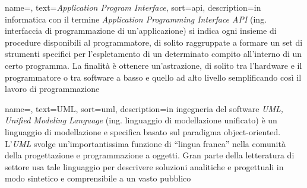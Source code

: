 
\renewcommand{\acronymname}{Acronimi e abbreviazioni}










\renewcommand{\glossaryname}{Glossario}

{
    name=,
    text=\emph{Application Program Interface},
    sort=api,
    description={in informatica con il termine \emph{Application Programming Interface API} (ing. interfaccia di programmazione di un'applicazione) si indica ogni insieme di procedure disponibili al programmatore, di solito raggruppate a formare un set di strumenti specifici per l'espletamento di un determinato compito all'interno di un certo programma. La finalità è ottenere un'astrazione, di solito tra l'hardware e il programmatore o tra software a basso e quello ad alto livello semplificando così il lavoro di programmazione}
}

{
    name=,
    text=UML,
    sort=uml,
    description={in ingegneria del software \emph{UML, Unified Modeling Language} (ing. linguaggio di modellazione unificato) è un linguaggio di modellazione e specifica basato sul paradigma object-oriented. L'\emph{UML} svolge un'importantissima funzione di ``lingua franca'' nella comunità della progettazione e programmazione a oggetti. Gran parte della letteratura di settore usa tale linguaggio per descrivere soluzioni analitiche e progettuali in modo sintetico e comprensibile a un vasto pubblico}
}

